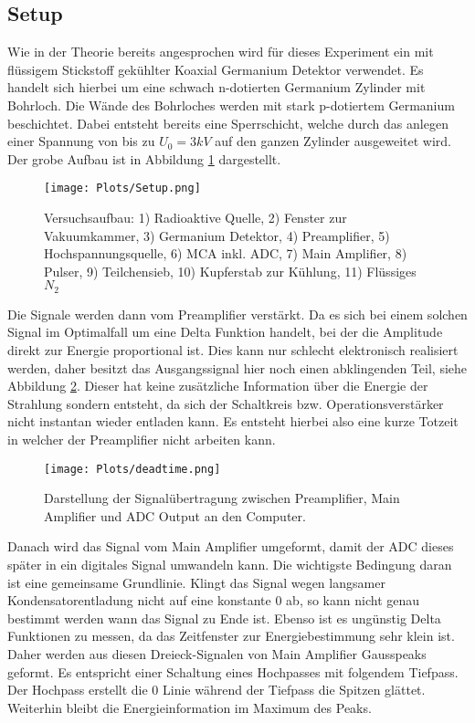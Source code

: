 \documentclass[]{article}
\begin{document}
\subsection{Setup}
Wie in der Theorie bereits angesprochen wird für dieses Experiment ein mit flüssigem Stickstoff gekühlter Koaxial Germanium Detektor verwendet. Es handelt sich hierbei um eine schwach n-dotierten Germanium Zylinder mit Bohrloch. Die Wände des Bohrloches werden mit stark p-dotiertem Germanium beschichtet. Dabei entsteht bereits eine Sperrschicht, welche durch das anlegen einer Spannung von bis zu $U_0=3kV$ auf den ganzen Zylinder ausgeweitet wird. Der grobe Aufbau ist in Abbildung \ref{fig:setup} dargestellt.

\begin{figure}[H]
\centering
\texttt{[image: Plots/Setup.png]}
\caption{Versuchsaufbau: 1) Radioaktive Quelle, 2) Fenster zur Vakuumkammer, 3) Germanium Detektor, 4) Preamplifier, 5) Hochspannungsquelle, 6) MCA inkl. ADC, 7) Main Amplifier, 8) Pulser, 9) Teilchensieb, 10) Kupferstab zur Kühlung, 11) Flüssiges $N_2$  }
\label{fig:setup}
\end{figure}

Die Signale werden dann vom Preamplifier verstärkt. Da es sich bei einem solchen Signal im Optimalfall um eine Delta Funktion handelt, bei der die Amplitude direkt zur Energie proportional ist. Dies kann nur schlecht elektronisch realisiert werden, daher besitzt das Ausgangssignal hier noch einen abklingenden Teil, siehe Abbildung \ref{fig:signals}. Dieser hat keine zusätzliche Information über die Energie der Strahlung sondern entsteht, da sich der Schaltkreis bzw. Operationsverstärker nicht instantan wieder entladen kann. Es entsteht hierbei also eine kurze Totzeit in welcher der Preamplifier nicht arbeiten kann. 

\begin{figure}[H]
\centering 
\texttt{[image: Plots/deadtime.png]}
\caption{Darstellung der Signalübertragung zwischen Preamplifier, Main Amplifier und ADC Output an den Computer. \cite{signalverarbeitung}  }
\label{fig:signals}
\end{figure}

Danach wird das Signal vom Main Amplifier umgeformt, damit der ADC dieses später in ein digitales Signal umwandeln kann. Die wichtigste Bedingung daran ist eine gemeinsame Grundlinie. Klingt das Signal wegen langsamer Kondensatorentladung nicht auf eine konstante 0 ab, so kann nicht genau bestimmt werden wann das Signal zu Ende ist. Ebenso ist es ungünstig Delta Funktionen zu messen, da das Zeitfenster zur Energiebestimmung sehr klein ist. Daher werden aus diesen Dreieck-Signalen von Main Amplifier Gausspeaks geformt. Es entspricht einer Schaltung eines Hochpasses mit folgendem Tiefpass. Der Hochpass erstellt die 0 Linie während der Tiefpass die Spitzen glättet. Weiterhin bleibt die Energieinformation im Maximum des Peaks.
\end{document}
